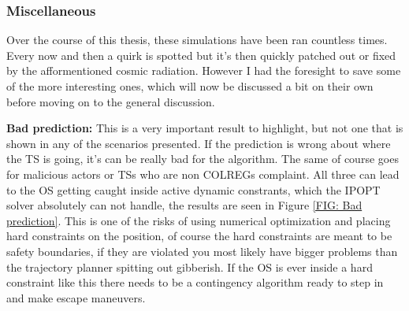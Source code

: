 \subsubsection{Miscellaneous}

Over the course of this thesis, these simulations have been ran countless times. Every now and then a quirk is spotted but it's
then quickly patched out or fixed by the afformentioned cosmic radiation. However I had the foresight to save some of the more
interesting ones, which will now be discussed a bit on their own before moving on to the general discussion.

\textbf{Bad prediction:}\newline
This is a very important result to highlight, but not one that is shown in any of the scenarios presented. If the prediction is wrong
about where the TS is going, it's can be really bad for the algorithm. The same of course goes for malicious actors or TSs who are
non COLREGs complaint. All three can lead to the OS getting caught inside active dynamic constrants, which the IPOPT solver
absolutely can not handle, the results are seen in Figure \ref{FIG: Bad prediction}. This is one of the risks of using
numerical optimization and placing hard constraints on the position, of course the hard constraints are meant to be safety boundaries,
if they are violated you most likely have bigger problems than the trajectory planner spitting out gibberish. If the OS is ever
inside a hard constraint like this there needs to be a contingency algorithm ready to step in and make escape maneuvers.

